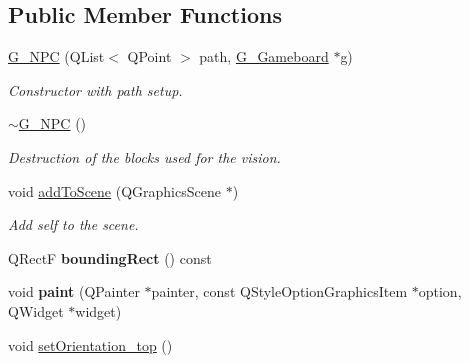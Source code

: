 \subsection*{Public Member Functions}
\begin{DoxyCompactItemize}
\item 
\hyperlink{class_g___n_p_c_a909491fd7337f820dc5070f32c819e81}{G\+\_\+\+N\+P\+C} (Q\+List$<$ Q\+Point $>$ path, \hyperlink{class_g___gameboard}{G\+\_\+\+Gameboard} $\ast$g)
\begin{DoxyCompactList}\small\item\em Constructor with path setup. \end{DoxyCompactList}\item 
\hypertarget{class_g___n_p_c_ae0e85bcc6900886a4cb52a77975836fe}{}\hyperlink{class_g___n_p_c_ae0e85bcc6900886a4cb52a77975836fe}{$\sim$\+G\+\_\+\+N\+P\+C} ()\label{class_g___n_p_c_ae0e85bcc6900886a4cb52a77975836fe}

\begin{DoxyCompactList}\small\item\em Destruction of the blocks used for the vision. \end{DoxyCompactList}\item 
\hypertarget{class_g___n_p_c_ae8e4eba7264564c913c7dac7cf00a5a1}{}void \hyperlink{class_g___n_p_c_ae8e4eba7264564c913c7dac7cf00a5a1}{add\+To\+Scene} (Q\+Graphics\+Scene $\ast$)\label{class_g___n_p_c_ae8e4eba7264564c913c7dac7cf00a5a1}

\begin{DoxyCompactList}\small\item\em Add self to the scene. \end{DoxyCompactList}\item 
\hypertarget{class_g___n_p_c_a3f27138c6ebfefc53346b7dad822c603}{}Q\+Rect\+F {\bfseries bounding\+Rect} () const \label{class_g___n_p_c_a3f27138c6ebfefc53346b7dad822c603}

\item 
\hypertarget{class_g___n_p_c_abc9dd518261733a8bb0ea33bf0d33b14}{}void {\bfseries paint} (Q\+Painter $\ast$painter, const Q\+Style\+Option\+Graphics\+Item $\ast$option, Q\+Widget $\ast$widget)\label{class_g___n_p_c_abc9dd518261733a8bb0ea33bf0d33b14}

\item 
\hypertarget{class_g___n_p_c_a2850ccbb21d59d211efda814a9868668}{}void \hyperlink{class_g___n_p_c_a2850ccbb21d59d211efda814a9868668}{set\+Orientation\+\_\+top} ()\label{class_g___n_p_c_a2850ccbb21d59d211efda814a9868668}


\end{DoxyCompactItemize}
